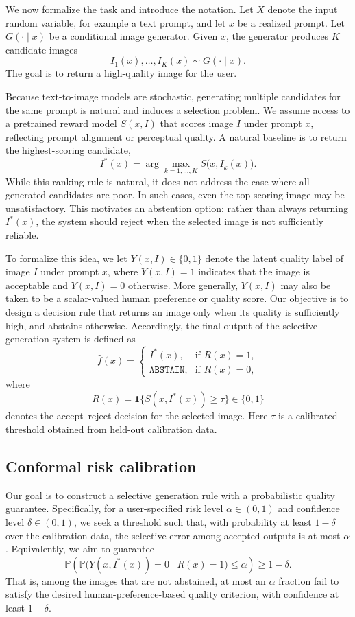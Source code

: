 \documentclass[twocolumn,11pt]{article}
\theoremstyle{plain}
\theoremstyle{definition}
\theoremstyle{remark}
\begin{document}
We now formalize the task and introduce the notation. Let $X$ denote the input random variable, for example a text prompt, and let $x$ be a realized prompt. Let $G(\cdot \mid x)$ be a conditional image generator. Given $x$, the generator produces $K$ candidate images
\[
I_1(x),\dots,I_K(x) \sim G(\cdot \mid x).
\]
The goal is to return a high-quality image for the user.

Because text-to-image models are stochastic, generating multiple candidates for the same prompt is natural and induces a selection problem. We assume access to a pretrained reward model \(S(x,I)\) that scores image \(I\) under prompt \(x\), reflecting prompt alignment or perceptual quality. A natural baseline is to return the highest-scoring candidate,
\[
I^*(x)=\arg\max_{k=1,\dots,K} S\bigl(x,I_k(x)\bigr).
\]
While this ranking rule is natural, it does not address the case where all generated candidates are poor. In such cases, even the top-scoring image may be unsatisfactory. This motivates an abstention option: rather than always returning \(I^*(x)\), the system should reject when the selected image is not sufficiently reliable.

To formalize this idea, we let $Y(x,I)\in\{0,1\}$
denote the latent quality label of image $I$ under prompt $x$, where $Y(x,I)=1$ indicates that the image is acceptable and $Y(x,I)=0$ otherwise. More generally, $Y(x,I)$ may also be taken to be a scalar-valued human preference or quality score. Our objective is to design a decision rule that returns an image only when its quality is sufficiently high, and abstains otherwise. Accordingly, the final output of the selective generation system is defined as
\[
\hat{f}(x)=
\begin{cases}
I^*(x), & \text{if } R(x)=1,\\
\texttt{ABSTAIN}, & \text{if } R(x)=0,
\end{cases}
\]
where
\[
R(x)=\mathbf{1}\{S(x,I^*(x))\ge \tau\}\in\{0,1\}
\]
denotes the accept--reject decision for the selected image. Here $\tau$ is a calibrated threshold obtained from held-out calibration data.

\subsection{Conformal risk calibration}
Our goal is to construct a selective generation rule with a probabilistic quality guarantee. Specifically, for a user-specified risk level $\alpha \in (0,1)$ and confidence level $\delta \in (0,1)$, we seek a threshold such that, with probability at least $1-\delta$ over the calibration data, the selective error among accepted outputs is at most $\alpha$. Equivalently, we aim to guarantee
\begin{equation}
\label{eq:target_coverage}
\mathbb{P}\!\left(
\mathbb{P}\bigl(Y(x,I^*(x))=0 \mid R(x)=1\bigr)\le \alpha
\right)\ge 1-\delta.
\end{equation}
That is, among the images that are not abstained, at most an $\alpha$ fraction fail to satisfy the desired human-preference-based quality criterion, with confidence at least $1-\delta$.
\end{document}
